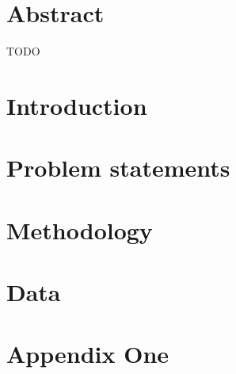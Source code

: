 \documentclass[a4paper,11pt]{report}
\begin{document}


\chapter*{Abstract}
TODO

\tableofcontents
\newpage

\chapter{Introduction}


\chapter{Problem statements}


\chapter{Methodology}


\chapter{Data}


\appendix
\chapter{Appendix One}


\printbibliography
\end{document}
